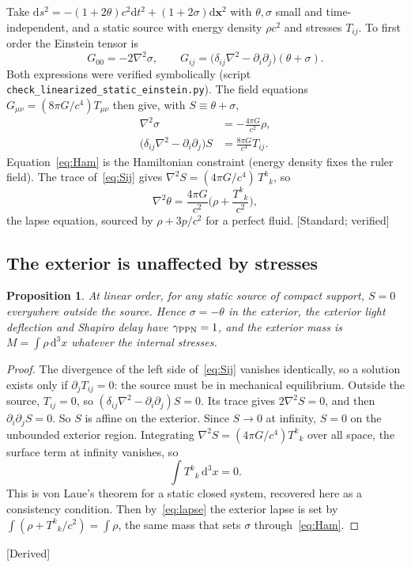 \documentclass[11pt]{article}
\newcommand{\thP}{\theta}
\newcommand{\sgP}{\sigma}
\newcommand{\dd}{\mathrm{d}}
\newcommand{\st}[1]{\textsf{\small[#1]}}
\theoremstyle{plain}
\newtheorem{proposition}{Proposition}
\theoremstyle{definition}
\theoremstyle{remark}
\begin{document}
Take $\dd s^2=-(1+2\thP)c^2\dd t^2+(1+2\sgP)\dd\mathbf x^2$ with $\thP,\sgP$ small and time-independent, and a static source with energy density $\rho c^2$ and stresses $T_{ij}$. To first order the Einstein tensor is
\begin{equation}
G_{00}=-2\nabla^2\sgP,
\qquad
G_{ij}=\big(\delta_{ij}\nabla^2-\partial_i\partial_j\big)(\thP+\sgP).
\label{eq:linG}
\end{equation}
Both expressions were verified symbolically (script \texttt{check\_linearized\_static\_einstein.py}). The field equations $G_{\mu\nu}=(8\pi G/c^4)T_{\mu\nu}$ then give, with $S\equiv\thP+\sgP$,
\begin{align}
\nabla^2\sgP&=-\frac{4\pi G}{c^2}\rho, \label{eq:Ham}\\
\big(\delta_{ij}\nabla^2-\partial_i\partial_j\big)S&=\frac{8\pi G}{c^4}T_{ij}. \label{eq:Sij}
\end{align}
Equation~\eqref{eq:Ham} is the Hamiltonian constraint (energy density fixes the ruler field). The trace of~\eqref{eq:Sij} gives $\nabla^2S=(4\pi G/c^4)\,T^k{}_k$, so
\begin{equation}
\nabla^2\thP=\frac{4\pi G}{c^2}\Big(\rho+\frac{T^k{}_k}{c^2}\Big),
\label{eq:lapse}
\end{equation}
the lapse equation, sourced by $\rho+3p/c^2$ for a perfect fluid. \st{Standard; verified}

\subsection{The exterior is unaffected by stresses}

\begin{proposition}\label{prop:exterior}
At linear order, for any static source of compact support, $S=0$ everywhere outside the source. Hence $\sgP=-\thP$ in the exterior, the exterior light deflection and Shapiro delay have $\gamma_{\rm PPN}=1$, and the exterior mass is $M=\int\rho\,\dd^3x$ whatever the internal stresses.
\end{proposition}

\begin{proof}
The divergence of the left side of~\eqref{eq:Sij} vanishes identically, so a solution exists only if $\partial_jT_{ij}=0$: the source must be in mechanical equilibrium. Outside the source, $T_{ij}=0$, so $(\delta_{ij}\nabla^2-\partial_i\partial_j)S=0$. Its trace gives $2\nabla^2S=0$, and then $\partial_i\partial_jS=0$. So $S$ is affine on the exterior. Since $S\to0$ at infinity, $S=0$ on the unbounded exterior region. Integrating $\nabla^2S=(4\pi G/c^4)T^k{}_k$ over all space, the surface term at infinity vanishes, so
\begin{equation}
\int T^k{}_k\,\dd^3x=0 .
\end{equation}
This is von Laue's theorem for a static closed system, recovered here as a consistency condition. Then by~\eqref{eq:lapse} the exterior lapse is set by $\int(\rho+T^k{}_k/c^2)=\int\rho$, the same mass that sets $\sgP$ through~\eqref{eq:Ham}.
\end{proof}
\st{Derived}
\end{document}
